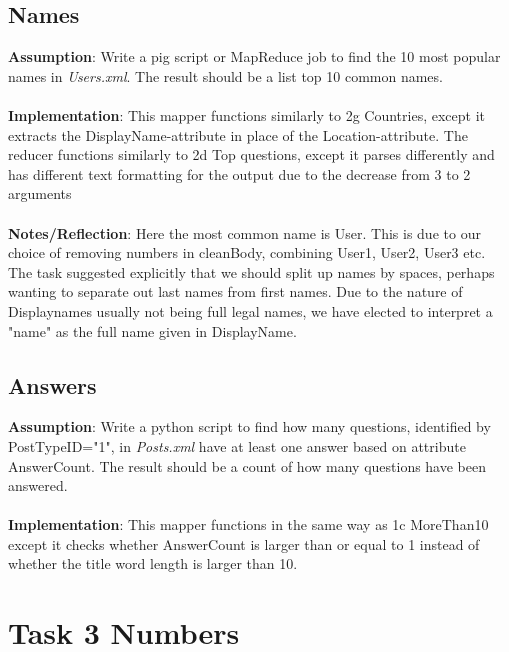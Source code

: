 \documentclass[fleqn,10pt]{wlscirep}
\begin{document}
\subsection{Names}
\textbf{Assumption}: Write a pig script or MapReduce job to find the 10 most popular names in \textit{Users.xml}. The result should be a list top 10 common names. \\ \\
\textbf{Implementation}: This mapper functions similarly to 2g Countries, except it extracts the DisplayName-attribute in place of the Location-attribute. The reducer functions similarly to 2d Top questions, except it parses differently and has different text formatting for the output due to the decrease from 3 to 2 arguments \\ \\
\textbf{Notes/Reflection}: Here the most common name is User. This is due to our choice of removing numbers in cleanBody, combining User1, User2, User3 etc. The task suggested explicitly that we should split up names by spaces, perhaps wanting to separate out last names from first names. Due to the nature of Displaynames usually not being full legal names, we have elected to interpret a "name" as the full name given in DisplayName.



\subsection{Answers}
\textbf{Assumption}: Write a python script to find how many questions, identified by PostTypeID="1", in \textit{Posts.xml} have at least one answer based on attribute AnswerCount. The result should be a count of how many questions have been answered.  \\ \\
\textbf{Implementation}: This mapper functions in the same way as 1c MoreThan10 except it checks whether AnswerCount is larger than or equal to 1 instead of whether the title word length is larger than 10.


\section{Task 3 Numbers}
\end{document}
